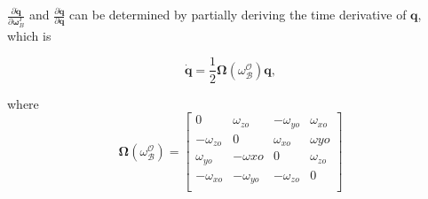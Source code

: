 $\frac{\partial \dot{\mathbf{q}}}{\partial \boldsymbol{\omega}_{B}^{I}}$ and $\frac{\partial \dot{\mathbf{q}}}{\partial \mathbf{q}}$ can be determined by partially deriving the time derivative of $\mathbf{q}$, which is

$$\dot{\mathbf{q}} = \frac{1}{2} \boldsymbol{\Omega}(\omega_{\mathcal{B}}^{\mathcal{O}}) \mathbf{q},$$

where $$\boldsymbol{\Omega}(\omega_{\mathcal{B}}^{\mathcal{O}}) = \begin{bmatrix}
	0 & \omega_{zo} & -\omega_{yo} & \omega_{xo} \\
	-\omega_{zo} & 0 & \omega_{xo} & \omega{yo} \\
	\omega_{yo} & -\omega{xo} & 0 & \omega_{zo} \\
	-\omega_{xo} & -\omega_{yo} & -\omega_{zo} & 0 \\
\end{bmatrix}$$

